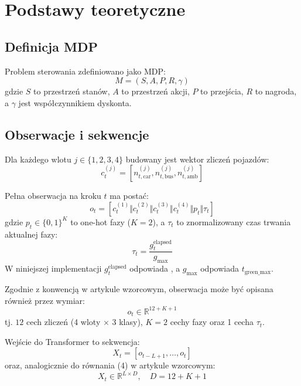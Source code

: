 \documentclass[12pt,a4paper]{article}
\begin{document}
\section{Podstawy teoretyczne}

\subsection{Definicja MDP}

Problem sterowania zdefiniowano jako MDP:
\begin{equation}
M = (S, A, P, R, \gamma)
\end{equation}
gdzie $S$ to przestrzeń stanów, $A$ to przestrzeń akcji, $P$ to przejścia, $R$ to nagroda, a $\gamma$ jest współczynnikiem dyskonta.

\subsection{Obserwacje i sekwencje}

Dla każdego wlotu $j \in \{1,2,3,4\}$ budowany jest wektor zliczeń pojazdów:
\begin{equation}
c_t^{(j)} = [n_{t,\text{car}}^{(j)}, n_{t,\text{bus}}^{(j)}, n_{t,\text{amb}}^{(j)}]
\end{equation}

Pełna obserwacja na kroku $t$ ma postać:
\begin{equation}
o_t = [c_t^{(1)} \Vert c_t^{(2)} \Vert c_t^{(3)} \Vert c_t^{(4)} \Vert p_t \Vert \tau_t]
\end{equation}
gdzie $p_t \in \{0,1\}^K$ to one-hot fazy ($K=2$), a $\tau_t$ to znormalizowany czas trwania aktualnej fazy:
\begin{equation}
\tau_t = \frac{g_t^{\text{elapsed}}}{g_{\text{max}}}
\end{equation}
W niniejszej implementacji $g_t^{\text{elapsed}}$ odpowiada , a $g_{\text{max}}$ odpowiada $t_{\text{green\_max}}$.

Zgodnie z konwencją w artykule wzorcowym, obserwacja może być opisana również przez wymiar:
\begin{equation}
o_t \in \mathbb{R}^{12 + K + 1}
\end{equation}
tj. $12$ cech zliczeń (4 wloty $\times$ 3 klasy), $K=2$ cechy fazy oraz 1 cecha $\tau_t$.

Wejście do Transformer to sekwencja:
\begin{equation}
X_t = [o_{t-L+1}, \dots, o_t]
\end{equation}
oraz, analogicznie do równania (4) w artykule wzorcowym:
\begin{equation}
X_t \in \mathbb{R}^{L \times D}, \quad D = 12 + K + 1
\end{equation}
\end{document}
